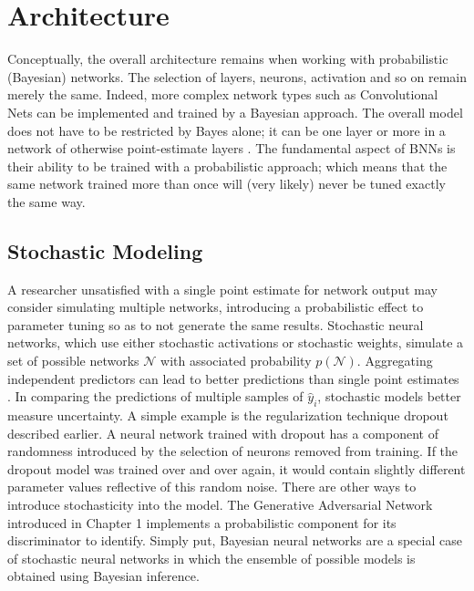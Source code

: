 \section{Architecture}

Conceptually, the overall architecture remains when working with probabilistic (Bayesian) networks.  The selection of layers, neurons, activation and so on remain merely the same.  Indeed, more complex network types such as Convolutional Nets \cite{shridhar2019comprehensive} can be implemented and trained by a Bayesian approach.  The overall model does not have to be restricted by Bayes alone; it can be one layer or more in a network of otherwise point-estimate layers \cite{Jospin}.  The fundamental aspect of BNNs is their ability to be trained with a probabilistic approach; which means that the same network trained more than once will (very likely) never be tuned exactly the same way.


\subsection{Stochastic Modeling}


A researcher unsatisfied with a single point estimate for network output may consider simulating multiple networks, introducing a probabilistic effect to parameter tuning so as to not generate the same results. Stochastic neural networks, which use either stochastic activations \cite{yu2021simple} or stochastic weights, simulate a set of possible networks $\mathcal{N}$ with associated probability $p(\mathcal{N})$.  Aggregating independent predictors can lead to better predictions than single point estimates \cite{Jospin}.  In comparing the predictions of multiple samples of $\hat{y}_i$, stochastic models better measure uncertainty.  A simple example is the regularization technique dropout \cite{goan2020bayesian} described earlier.  A neural network trained with dropout has a component of randomness introduced by the selection of neurons removed from training.  If the dropout model was trained over and over again, it would contain slightly different parameter values reflective of this random noise.  There are other ways to introduce stochasticity into the model.  The Generative Adversarial Network \cite{ziyin2022stochastic} introduced in Chapter 1 implements a probabilistic component for its discriminator to identify.  %
Simply put, Bayesian neural networks are a special case of stochastic neural networks in which the ensemble of possible models is obtained using Bayesian inference. \cite{mackay1992practical}


